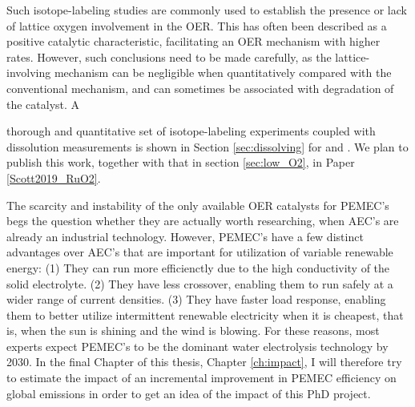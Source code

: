Such isotope-labeling studies are commonly used to establish the presence or lack of lattice oxygen involvement in the OER. This has often been described as a positive catalytic characteristic, facilitating an OER mechanism with higher rates\cite{Grimaud2017, Geiger2018}. However, such conclusions need to be made carefully, as the lattice-involving mechanism can be negligible when quantitatively compared with the conventional mechanism, and can sometimes be associated with degradation of the catalyst. A 























thorough and quantitative set of isotope-labeling experiments coupled with dissolution measurements is shown in Section \ref{sec:dissolving} for  and . We plan to publish this work, together with that in section \ref{sec:low_O2}, in Paper \ref{Scott2019_RuO2}.


The scarcity and instability of the only available OER catalysts for PEMEC's begs the question whether they are actually worth researching, when AEC's are already an industrial technology. However, PEMEC's have a few distinct advantages over AEC's that are important for utilization of variable renewable energy\cite{Carmo2013}: (1) They can run more efficienctly due to the high conductivity of the solid electrolyte. (2) They have less  crossover, enabling them to run safely at a wider range of current densities. (3) They have faster load response, enabling them to better utilize intermittent renewable electricity when it is cheapest, that is, when the sun is shining and the wind is blowing. For these reasons, most experts expect PEMEC's to be the dominant water electrolysis technology by 2030\cite{Schmidt2017}. In the final Chapter of this thesis, Chapter \ref{ch:impact}, I will therefore try to estimate the impact of an incremental improvement in PEMEC efficiency on global  emissions in order to get an idea of the impact of this PhD project.